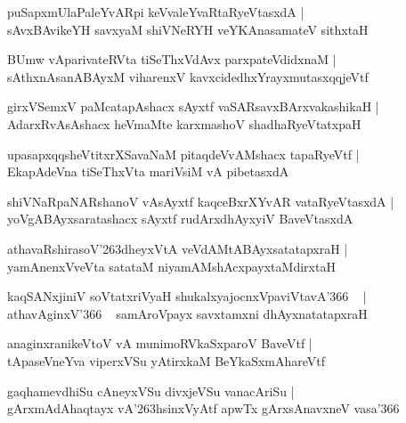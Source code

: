 \documentclass[twoside,12pt,openright]{book}
\def\S{\char'263}
\newcounter{shloka}[chapter]
\begin{document}
\begin{shloka}
puSapxmUlaPaleYvARpi keVvaleYvaRtaRyeVtasxdA |\\
sAvxBAvikeYH savxyaM shiVNeRYH veYKAnasamateV sithxtaH 
\end{shloka}

\begin{shloka}
BUmw vAparivateRVta tiSeThxVdAvx parxpateVdidxnaM |\\
sAthxnAsanABAyxM viharenxV kavxcidedhxYrayxmutasxqqjeVtf 
\end{shloka}

\begin{shloka}
girxVSemxV paMcatapAshacx sAyxtf vaSARsavxBArxvakashikaH |\\
AdarxRvAsAshacx heVmaMte karxmashoV shadhaRyeVtatxpaH 
\end{shloka}

\begin{shloka}
upasapxqqsheVtitxrXSavaNaM pitaqdeVvAMshacx tapaRyeVtf |\\
EkapAdeVna tiSeThxVta mariVsiM vA pibetasxdA 
\end{shloka}

\begin{shloka}
shiVNaRpaNARshanoV vAsAyxtf kaqceBxrXYvAR vataRyeVtasxdA |\\
yoVgABAyxsaratashacx sAyxtf rudArxdhAyxyiV BaveVtasxdA 
\end{shloka}

\begin{shloka}
athavaRshirasoV\S dheyxVtA veVdAMtABAyxsatatapxraH |\\
yamAnenxVveVta satataM niyamAMshAcxpayxtaMdirxtaH 
\end{shloka}

\begin{shloka}
kaqSANxjiniV soVtatxriVyaH shukalxyajocnxVpaviVtavA\char'366 ~ |\\
athavAginxV\char'366 ~ samAroVpayx savxtamxni dhAyxnatatapxraH 
\end{shloka}

\begin{shloka}
anaginxranikeVtoV vA munimoRVkaSxparoV BaveVtf |\\
tApaseVneYva viperxVSu yAtirxkaM BeYkaSxmAhareVtf 
\end{shloka}

\begin{shloka}
gaqhamevdhiSu cAneyxVSu divxjeVSu vanacAriSu |\\
gArxmAdAhaqtayx vA\S hsinxVyAtf apwTx gArxsAnavxneV vasa\char'366 
\end{shloka}
\end{document}
